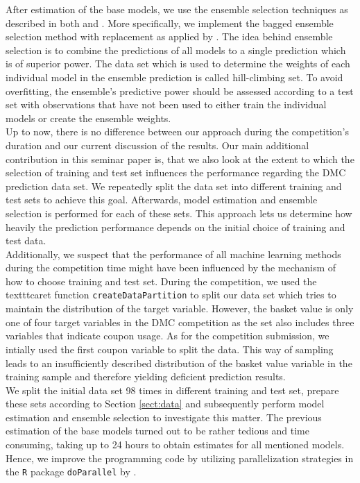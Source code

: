\documentclass[12pt]{article}
\begin{document}
After estimation of the base models, we use the ensemble selection techniques as described in both \cite{Caruana2006} and \cite{Caruana04}. More specifically, we implement the bagged ensemble selection method with replacement as applied by \cite{Caruana04}. The idea behind ensemble selection is to combine the predictions of all models to a single prediction which is of superior power. The data set which is used to determine the weights of each individual model in the ensemble prediction is called hill-climbing set. To avoid overfitting, the ensemble's predictive power should be assessed according to a test set with observations that have not been used to either train the individual models or create the ensemble weights.\\

Up to now, there is no difference between our approach during the competition's duration and our current discussion of the results. Our main additional contribution in this seminar paper is, that we also look at the extent to which the selection of training and test set influences the performance regarding the DMC prediction data set. We repeatedly split the data set into different training and test sets to achieve this goal. Afterwards, model estimation and ensemble selection is performed for each of these sets.
This approach lets us determine how heavily the prediction performance depends on the initial choice of training and test data.  \\

Additionally, we suspect that the performance of all machine learning methods during the competition time might have been influenced by the mechanism of how to choose training and test set. During the competition, we used the texttt{caret} function \texttt{createDataPartition} to split our data set which tries to maintain the distribution of the target variable.
However, the basket value is only one of four target variables in the DMC competition as the set also includes three variables that indicate coupon usage. As for the competition submission, we intially used the first coupon variable to split the data. This way of sampling leads to an insufficiently described distribution of the basket value variable in the training sample and therefore yielding deficient prediction results. \\

We split the initial data set 98 times in different training and test set, prepare these sets according to Section \ref{sect:data} and subsequently perform model estimation and ensemble selection to investigate this matter. The previous estimation of the base models turned out to be rather tedious and time consuming, taking up to 24 hours to obtain estimates for all mentioned models. Hence, we improve the programming code by utilizing parallelization strategies in the \texttt{R} package \texttt{doParallel} by \cite{doParallel}.
\end{document}
